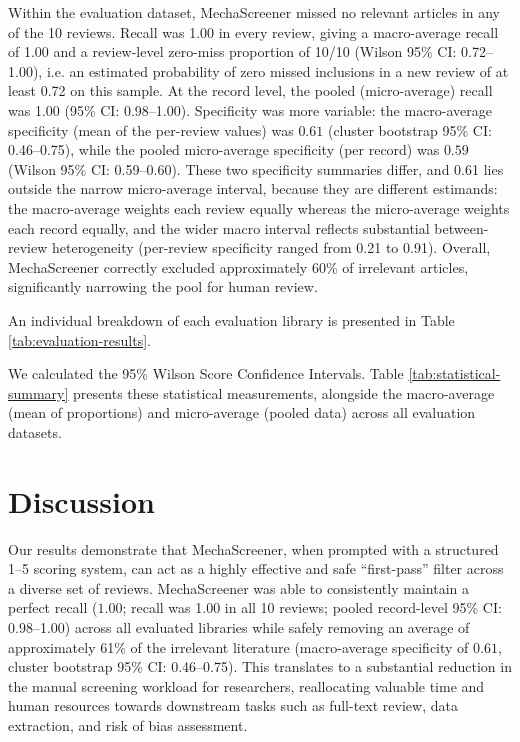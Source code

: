 \documentclass[11pt,a4paper]{article}
\begin{document}
Within the evaluation dataset, MechaScreener missed no relevant articles in any of the 10 reviews. Recall was 1.00 in every review, giving a macro-average recall of 1.00 and a review-level zero-miss proportion of 10/10 (Wilson 95\% CI: 0.72--1.00), i.e. an estimated probability of zero missed inclusions in a new review of at least 0.72 on this sample. At the record level, the pooled (micro-average) recall was 1.00 (95\% CI: 0.98--1.00). Specificity was more variable: the macro-average specificity (mean of the per-review values) was $0.61$ (cluster bootstrap 95\% CI: 0.46--0.75), while the pooled micro-average specificity (per record) was $0.59$ (Wilson 95\% CI: 0.59--0.60). These two specificity summaries differ, and 0.61 lies outside the narrow micro-average interval, because they are different estimands: the macro-average weights each review equally whereas the micro-average weights each record equally, and the wider macro interval reflects substantial between-review heterogeneity (per-review specificity ranged from 0.21 to 0.91). Overall, MechaScreener correctly excluded approximately 60\% of irrelevant articles, significantly narrowing the pool for human review.

An individual breakdown of each evaluation library is presented in Table \ref{tab:evaluation-results}.

\begin{table}[ht]
\centering
\caption{Results Across 10 Evaluation Libraries}
\label{tab:evaluation-results}

\end{table}

We calculated the 95\% Wilson Score Confidence Intervals. Table \ref{tab:statistical-summary} presents these statistical measurements, alongside the macro-average (mean of proportions) and micro-average (pooled data) across all evaluation datasets.

\begin{table}[ht]
\centering
\caption{Statistical Summary Across 10 Evaluation Libraries}
\label{tab:statistical-summary}

\end{table}

\section{Discussion}
Our results demonstrate that MechaScreener, when prompted with a structured 1--5 scoring system, can act as a highly effective and safe ``first-pass'' filter across a diverse set of reviews. MechaScreener was able to consistently maintain a perfect recall ($1.00$; recall was 1.00 in all 10 reviews; pooled record-level 95\% CI: 0.98--1.00) across all evaluated libraries while safely removing an average of approximately 61\% of the irrelevant literature (macro-average specificity of $0.61$, cluster bootstrap 95\% CI: 0.46--0.75). This translates to a substantial reduction in the manual screening workload for researchers, reallocating valuable time and human resources towards downstream tasks such as full-text review, data extraction, and risk of bias assessment.
\end{document}
